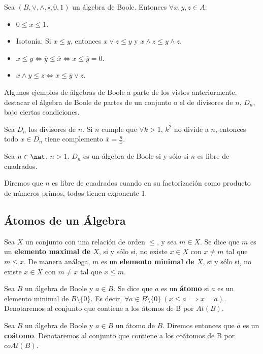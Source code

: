 \smallskip
\begin{properties}
    Sea $(B, \lor, \land, \overline{\square}, 0, 1)$ un álgebra de Boole. Entonces $\forall x,y,z \in A$:
    \begin{itemize}
        \item $0 \leq x \leq 1$.
        \item Isotonía: Si $x \leq y$, entonces $x \lor z \leq y$ y $x \land z \leq y \land z$.
        \item $x\leq y \Longleftrightarrow \overline{y} \leq \overline{x} \Longleftrightarrow x \leq \overline{y} = 0$.
        \item $x \land y \leq z \Longleftrightarrow x \leq \overline{y} \lor z$.
    \end{itemize}
\end{properties}
\begin{ejemplo}
    Algunos ejemplos de álgebras de Boole a parte de los vistos anteriormente, destacar el álgebra de Boole de partes de un conjunto o el de divisores de $n$,
    $D_n$, bajo ciertas condiciones.
\end{ejemplo}

\begin{nprop}
    Sea $D_n$ los divisores de $n$. Si $n$ cumple que $\forall k > 1$, $k^2$ no divide a $n$, entonces todo $x \in D_n$ tiene complemento $\overline{x} = \frac{n}{x}$.
\end{nprop}
\begin{nprop}
    Sea $n \in \nat$, $n > 1$. $D_n$ es un álgebra de Boole si y sólo si $n$ es libre de cuadrados.
\end{nprop}
\begin{nota}
    Diremos que $n$ es libre de cuadrados cuando en su factorización como producto de números primos, todos tienen exponente 1.
\end{nota}

\subsection{Átomos de un Álgebra}
\begin{ndef}
    Sea $X$ un conjunto con una relación de orden $\leq$, y sea $m \in X$. Se dice que $m$ es un \textbf{elemento maximal de $X$}, si y sólo si, no existe $x \in X$ con $x \neq m$ tal que $m \leq x$.
    De manera análoga, $m$ es un \textbf{elemento minimal de $X$}, si y sólo si, no existe $x \in X$ con $m \neq x$ tal que $x \leq m$.
\end{ndef}
\begin{ndef}[Átomo]
    Sea $B$ un álgebra de Boole y $a \in B$. Se dice que $a$ es un \textbf{átomo} si $a$ es un elemento minimal de $B \setminus \{0\}$. Es decir,
    $\forall a \in B \setminus \{0\} \ (x \leq a \implies x = a)$. Denotaremos al conjunto que contiene a los átomos de B por $At(B)$.
\end{ndef}
\begin{ndef}[Coátomo]
    Sea $B$ un álgebra de Boole y $a \in B$ un átomo de $B$. Diremos entonces que $\overline{a}$ es un \textbf{coátomo}.
    Denotaremos al conjunto que contiene a los coátomos de B por $coAt(B)$.
\end{ndef}

